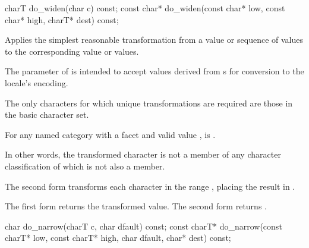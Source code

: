%
\begin{itemdecl}
charT        do_widen(char c) const;
const char*  do_widen(const char* low, const char* high, charT* dest) const;
\end{itemdecl}

\begin{itemdescr}
\pnum
\effects
Applies the simplest reasonable transformation
from a  value or sequence of  values
to the corresponding  value or values.
\begin{footnote}
The parameter  of  is intended to
accept values derived from s
for conversion to the locale's encoding.
\end{footnote}
The only characters for which unique transformations are required
are those in the basic character set.

For any named  category with
a  facet  and
valid  value ,
 is .
\begin{footnote}
In other words, the transformed character is not
a member of any character classification
of which  is not also a member.
\end{footnote}

The second form transforms
each character  in the range ,
placing the result in .

\pnum
\returns
The first form returns the transformed value.
The second form returns .
\end{itemdescr}

%
\begin{itemdecl}
char         do_narrow(charT c, char dfault) const;
const charT* do_narrow(const charT* low, const charT* high, char dfault, char* dest) const;
\end{itemdecl}

